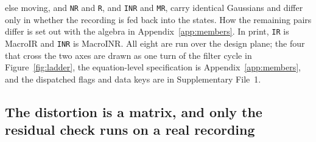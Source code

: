 \begin{table}[htbp]
{else moving, and \texttt{NR} and \texttt{R}, and \texttt{INR} and \texttt{MR}, carry identical
Gaussians and differ only in whether the recording is fed back into the states. How the remaining
pairs differ is set out with the algebra in Appendix~\ref{app:members}.
In print, \texttt{IR} is MacroIR and \texttt{INR} is
MacroINR. All eight are run over the design plane; the four that
cross the two axes are drawn as one turn of the filter cycle in Figure~\ref{fig:ladder}, the
equation-level specification is
Appendix~\ref{app:members}, and the dispatched flags and data keys are in
Supplementary File~1.}
\label{tab:members}
\end{table}


\subsection*{The distortion is a matrix, and only the residual check runs on a real recording}

